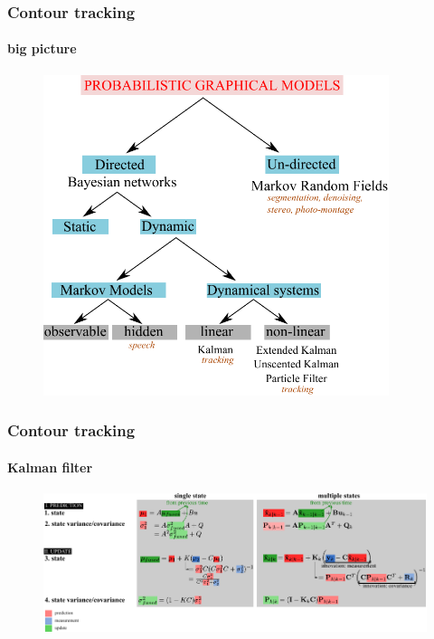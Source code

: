 \begin{frame}
\frametitle{Contour tracking}
\framesubtitle{big picture}
\logoCSIPCPL\mypagenum
	\begin{figure}
		\includegraphics[width=0.9\textwidth]{figs/PRML_PGM_overview.pdf}
	\end{figure}
\end{frame}


\begin{frame}
\frametitle{Contour tracking}
\framesubtitle{Kalman filter}
\logoCSIPCPL\mypagenum
	\begin{figure}
		\includegraphics[width=1.0\textwidth]{figs/TRK_KalmanFilter_equations.pdf}
	\end{figure}
\end{frame}


